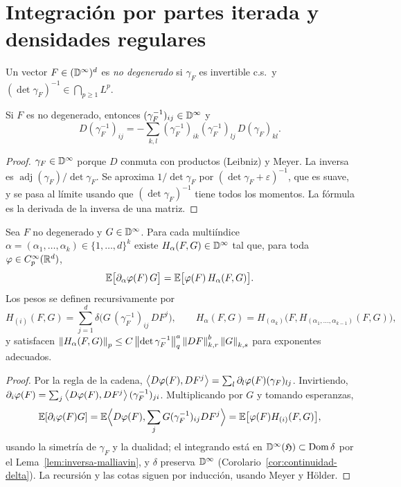 \section{Integración por partes iterada y densidades regulares}

\begin{definicion}
Un vector $F\in(\mathbb{D}^\infty)^d$ es \emph{no degenerado} si $\gamma_F$ es invertible c.s.\ y
$(\det\gamma_F)^{-1}\in\bigcap_{p\ge1}L^p$.
\end{definicion}

\begin{lema}\label{lem:inversa-malliavin}
Si $F$ es no degenerado, entonces $(\gamma_F^{-1})_{ij}\in\mathbb{D}^\infty$ y
\[
  D(\gamma_F^{-1})_{ij}=-\sum_{k,l}(\gamma_F^{-1})_{ik}(\gamma_F^{-1})_{lj}\,D(\gamma_F)_{kl}.
\]
\end{lema}

\begin{proof}
$\gamma_F\in\mathbb{D}^\infty$ porque $D$ conmuta con productos (Leibniz) y Meyer. La inversa es
$\operatorname{adj}(\gamma_F)/\det\gamma_F$. Se aproxima $1/\det\gamma_F$ por $(\det\gamma_F+\varepsilon)^{-1}$, que es suave, y se pasa al límite
usando que $(\det\gamma_F)^{-1}$ tiene todos los momentos. La fórmula es la derivada de la inversa de
una matriz.
\end{proof}

\begin{proposicion}\label{prop:ibp-iterada}
Sea $F$ no degenerado y $G\in\mathbb{D}^\infty$. Para cada
multiíndice $\alpha=(\alpha_1,\dots,\alpha_k)\in\{1,\dots,d\}^k$ existe $H_\alpha(F,G)\in\mathbb{D}^\infty$ tal que, para toda $\varphi\in
C_p^\infty(\mathbb{R}^d)$,
\[
  \mathbb{E}\big[\partial_\alpha\varphi(F)\,G\big]=\mathbb{E}\big[\varphi(F)\,H_\alpha(F,G)\big].
\]
Los pesos se definen recursivamente por
\[
  H_{(i)}(F,G)=\sum_{j=1}^d\delta\big(G\,(\gamma_F^{-1})_{ij}\,DF^j\big),\qquad H_\alpha(F,G)=H_{(\alpha_k)}\big(F,H_{(\alpha_1,\dots,\alpha_{k-1})}(F,G)\big),
\]
y satisfacen $\left\lVert H_\alpha(F,G)\right\rVert_p\le C\left\lVert \det\gamma_F^{-1}\right\rVert_q^a\left\lVert DF\right\rVert_{k,r}^b\left\lVert G\right\rVert_{k,s}$ para exponentes adecuados.
\end{proposicion}

\begin{proof}
Por la regla de la cadena, $\left\langle D\varphi(F), DF^j\right\rangle=\sum_l\partial_l\varphi(F)(\gamma_F)_{lj}$. Invirtiendo,
$\partial_i\varphi(F)=\sum_j\left\langle D\varphi(F), DF^j\right\rangle(\gamma_F^{-1})_{ji}$. Multiplicando por $G$ y tomando esperanzas,
\[
  \mathbb{E}[\partial_i\varphi(F)G]=\mathbb{E}\Big\langle D\varphi(F),\sum_jG(\gamma_F^{-1})_{ij}DF^j\Big\rangle=\mathbb{E}\big[\varphi(F)H_{(i)}(F,G)\big],
\]
usando la simetría de $\gamma_F$ y la dualidad; el integrando está en $\mathbb{D}^\infty(\mathfrak{H})\subset\operatorname{Dom}\delta$ por el Lema~\ref{lem:inversa-malliavin},
y $\delta$ preserva $\mathbb{D}^\infty$ (Corolario~\ref{cor:continuidad-delta}). La recursión y las cotas siguen por inducción, usando Meyer
y Hölder.
\end{proof}

